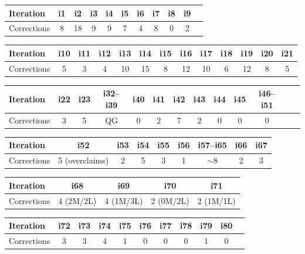 \documentclass[11pt,a4paper]{article}
\begin{document}
\begin{center}
\begin{tabular}{lcccccccccc}
\toprule
Iteration & i1 & i2 & i3 & i4 & i5 & i6 & i7 & i8 & i9 \\
\midrule
Corrections & 8 & 18 & 9 & 9 & 7 & 4 & 8 & 0 & 2 \\
\bottomrule
\end{tabular}
\end{center}

\begin{center}
\begin{tabular}{lcccccccccccc}
\toprule
Iteration & i10 & i11 & i12 & i13 & i14 & i15 & i16 & i17 & i18 & i19 & i20 & i21 \\
\midrule
Corrections & 5 & 3 & 4 & 10 & 15 & 8 & 12 & 10 & 6 & 12 & 8 & 5 \\
\bottomrule
\end{tabular}
\end{center}

\begin{center}
\begin{tabular}{lcccccccccccc}
\toprule
Iteration & i22 & i23 & i32--i39 & i40 & i41 & i42 & i43 & i44 & i45 & i46--i51 \\
\midrule
Corrections & 3 & 5 & QG & 0 & 2 & 7 & 2 & 0 & 0 & 0 \\
\bottomrule
\end{tabular}
\end{center}

\begin{center}
\begin{tabular}{lcccccccc}
\toprule
Iteration & i52 & i53 & i54 & i55 & i56 & i57--i65 & i66 & i67 \\
\midrule
Corrections & 5 (overclaims) & 2 & 5 & 3 & 1 & $\sim$8 & 2 & 3 \\
\bottomrule
\end{tabular}
\end{center}

\begin{center}
\begin{tabular}{lcccc}
\toprule
Iteration & i68 & i69 & i70 & i71 \\
\midrule
Corrections & 4 (2M/2L) & 4 (1M/3L) & 2 (0M/2L) & 2 (1M/1L) \\
\bottomrule
\end{tabular}
\end{center}

\begin{center}
\begin{tabular}{lcccccccccc}
\toprule
Iteration & i72 & i73 & i74 & i75 & i76 & i77 & i78 & i79 & i80 \\
\midrule
Corrections & 3 & 3 & 4 & 1 & 0 & 0 & 0 & 1 & 0 \\
\bottomrule
\end{tabular}
\end{center}
\end{document}
